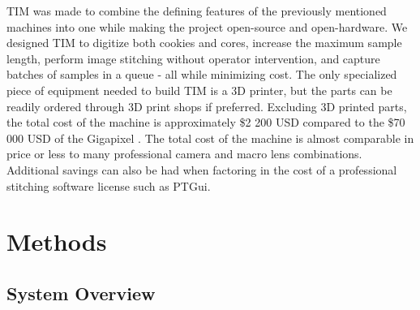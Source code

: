 \documentclass[a4paper,12pt]{article}
\begin{document}
TIM was made to combine the defining features of the previously mentioned machines into one while making the project open-source and open-hardware. 
We designed TIM to digitize both cookies and cores, increase the maximum sample length, perform image stitching without operator intervention, and capture batches of samples in a queue - all while minimizing cost. 
The only specialized piece of equipment needed to build TIM is a 3D printer, but the parts can be readily ordered through 3D print shops if preferred.
Excluding 3D printed parts, the total cost of the machine is approximately \$2 200 USD compared to the \$70 000 USD of the Gigapixel \citep{griffin_gigapixel_2021}.
The total cost of the machine is almost comparable in price or less to many professional camera and macro lens combinations.
Additional savings can also be had when factoring in the cost of a professional stitching software license such as PTGui. 

\section{Methods}

\subsection{System Overview} %
\end{document}
